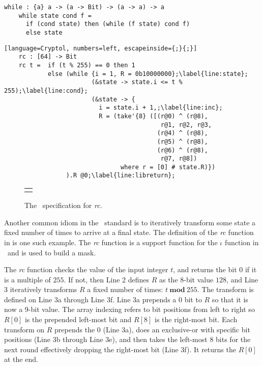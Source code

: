 \newsavebox{\whilemethod}
\begin{lrbox}{\whilemethod}
  \begin{lstlisting}[language=Cryptol]
    while : {a} a -> (a -> Bit) -> (a -> a) -> a
    while state cond f = 
      if (cond state) then (while (f state) cond f)	
      else state
  \end{lstlisting}
\end{lrbox}

\newsavebox{\RcCryLib}
\begin{lrbox}{\RcCryLib}
  \begin{lstlisting}[language=Cryptol, numbers=left, escapeinside={;}{;}]
    rc : [64] -> Bit
    rc t =  if (t % 255) == 0 then 1 
            else (while {i = 1, R = 0b10000000};\label{line:state};
                        (&state -> state.i <= t % 255);\label{line:cond};
                        (&state -> {
                          i = state.i + 1,;\label{line:inc};
                          R = (take'{8} ([(r@0) ^ (r@8),
                                           r@1, r@2, r@3,
                                          (r@4) ^ (r@8),
                                          (r@5) ^ (r@8),
                                          (r@6) ^ (r@8),
                                           r@7, r@8]) 
                                where r = [0] # state.R)})
                 ).R @0;\label{line:libreturn};
  \end{lstlisting}
\end{lrbox}

\begin{figure}[t]
  \begin{center}
    \begin{tabular}{l}
      \usebox{\fipsRc}
    \end{tabular}
  \end{center}
  \caption{The \fips\ specification for \emph{rc}.}
  \label{fig:rc}
\end{figure}


Another common idiom in the \fips\ standard is to iteratively transform some state a fixed number of times to arrive at a final state.
The definition of the \emph{rc} function in  is one such example.
The \emph{rc} function is a support function for the $\iota$ function in \keccak\ and is used to build a mask.

The \emph{rc} function checks the value of the input integer $t$, and returns the bit $0$ if it is a multiple of $255$.
If not, then Line 2 defines $R$ as the 8-bit value $128$, and Line 3 iteratively transforms $R$ a fixed number of times: $t\ \mathbf{mod}\ 255$.
The transform is defined on Line 3a through Line 3f.
Line 3a prepends a $0$ bit to $R$ so that it is now a 9-bit value. The array indexing refers to bit positions from left to right so $R[0]$ is the prepended left-most bit and $R[8]$ is the right-most bit. Each transform on $R$ prepends the 0 (Line 3a), does an exclusive-or with specific bit positions (Line 3b through Line 3e), and then takes the left-most 8 bits for the next round effectively dropping the right-most bit (Line 3f).
It returns the $R[0]$ at the end.

